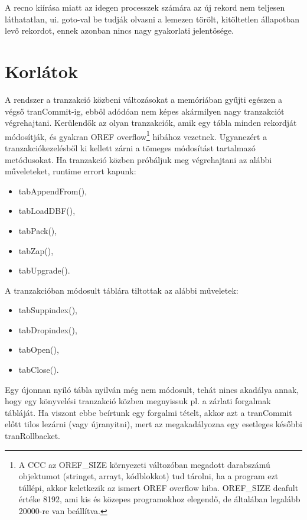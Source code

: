 {\begin{description}
A recno kiírása miatt az idegen processzek számára az új rekord
nem teljesen láthatatlan, ui. goto-val be tudják olvasni a lemezen
törölt, kitöltetlen állapotban levő rekordot, ennek azonban
nincs nagy gyakorlati jelentősége.



\end{description}
} 

 

\section{Korlátok}

A rendszer a tranzakció közbeni változásokat a memóriában gyűjti
egészen a végső tranCommit-ig, ebből adódóan nem képes akármilyen nagy 
tranzakciót végrehajtani. Kerülendők az olyan tranzakciók, amik egy 
tábla minden rekordját módosítják, és gyakran 
OREF overflow\footnote{A CCC az  OREF\_SIZE
környezeti változóban megadott darabszámú objektumot (stringet,
arrayt, kódblokkot) tud tárolni, ha a program ezt túllépi,
akkor keletkezik az ismert  OREF overflow hiba.
 OREF\_SIZE deafult értéke 8192, ami kis és közepes
programokhoz elegendő, de általában legalább 20000-re van beállítva.} 
hibához vezetnek. Ugyanezért  a tranzakciókezelésből ki kellett
zárni a tömeges módosítást tartalmazó metódusokat.
Ha tranzakció közben próbáljuk meg végrehajtani az alábbi műveleteket, 
runtime errort kapunk:
\begin{itemize}
\item tabAppendFrom(),
\item tabLoadDBF(),
\item tabPack(),
\item tabZap(),
\item tabUpgrade().
\end{itemize}
 
A tranzakcióban módosult táblára tiltottak az alábbi műveletek:
\begin{itemize}
\item tabSuppindex(),
\item tabDropindex(),
\item tabOpen(),
\item tabClose().
\end{itemize}
Egy újonnan nyíló tábla nyilván még nem módosult, 
tehát nincs akadálya annak, hogy egy könyvelési tranzakció közben 
megnyissuk pl.{} a zárlati forgalmak tábláját. Ha viszont ebbe beírtunk 
egy forgalmi tételt, akkor azt a tranCommit előtt tilos lezárni 
(vagy újranyitni), mert az megakadályozna egy esetleges későbbi 
tranRollbacket. 
 

